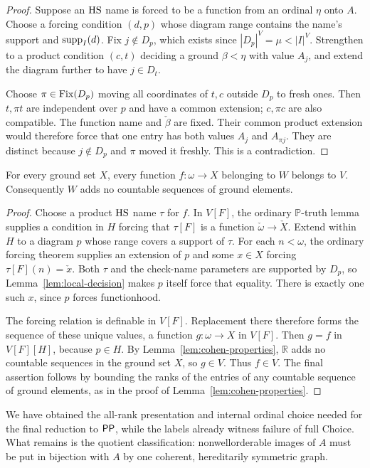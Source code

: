 \begin{proof}
Suppose an \(\mathrm{HS}\) name is forced to be a function from an
ordinal \(\eta\) onto \(A\).
Choose a forcing condition \((d,p)\) whose diagram range contains
the name's support and \(\operatorname{supp}_I(d)\).
Fix \(j\notin D_p\), which exists since
\(|D_p|^V=\mu<|I|^V\).
Strengthen to a product condition \((c,t)\) deciding
a ground \(\beta<\eta\) with value \(A_j\), and extend the
diagram further to have \(j\in D_t\).

Choose \(\pi\in\operatorname{Fix}(D_p)\) moving all coordinates of \(t,c\)
outside \(D_p\) to fresh ones.
Then \(t,\pi t\) are independent over \(p\) and have a common
extension; \(c,\pi c\) are also compatible.
The function name and \(\check\beta\) are fixed.
Their common product extension would therefore force that
one entry has both values \(A_j\) and \(A_{\pi j}\).
They are distinct because \(j\notin D_p\) and \(\pi\) moved it
freshly.  This is a contradiction.

\end{proof}

\begin{proposition}\label{prop:no-countable-sequences}
For every ground set \(X\), every function \(f:\omega\to X\)
belonging to \(W\) belongs to \(V\).
Consequently \(W\) adds no countable sequences of ground elements.
\end{proposition}

\begin{proof}
Choose a product \(\mathrm{HS}\) name \(\tau\) for \(f\).
In \(V[F]\), the ordinary \(\mathbb P\)-truth lemma supplies
a condition in \(H\) forcing that \(\tau[F]\) is a function
\(\check\omega\to\check X\).
Extend within \(H\) to a diagram \(p\) whose range covers a
support of \(\tau\).
For each \(n<\omega\), the ordinary forcing theorem supplies
an extension of \(p\) and some \(x\in X\) forcing
\(\tau[F](n)=\check x\).
Both \(\tau\) and the check-name parameters are supported by
\(D_p\), so Lemma~\ref{lem:local-decision} makes \(p\)
itself force that equality.
There is exactly one such \(x\), since \(p\) forces
functionhood.

The forcing relation is definable in \(V[F]\).
Replacement there therefore forms the sequence of these unique
values, a function \(g:\omega\to X\) in \(V[F]\).
Then \(g=f\) in \(V[F][H]\), because \(p\in H\).
By Lemma~\ref{lem:cohen-properties}, \(\mathbb R\) adds no
countable sequences in the ground set \(X\), so \(g\in V\).
Thus \(f\in V\).
The final assertion follows by bounding the ranks of the entries
of any countable sequence of ground elements, as in the proof of
Lemma~\ref{lem:cohen-properties}.
\end{proof}

We have obtained the all-rank presentation and internal ordinal choice
needed for the final reduction to \(\mathsf{PP}\), while the labels already
witness failure of full Choice.  What remains is the quotient
classification: nonwellorderable images of \(A\) must be put in
bijection with \(A\) by one coherent, hereditarily symmetric graph.

